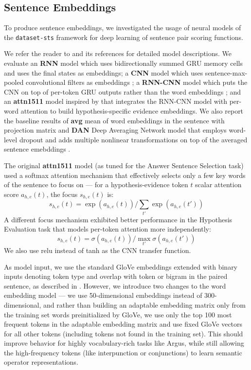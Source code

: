\documentclass[11pt]{article}
\begin{document}
\subsection{Sentence Embeddings}

To produce sentence embeddings, we investigated the usage
of neural models of the \texttt{dataset-sts} framework
for deep learning of sentence pair scoring functions. \cite{sps}

We refer the reader to \cite{sps} and its references for detailed
model descriptions.  We evaluate an \textbf{RNN} model which uses bidirectionally
summed GRU memory cells \cite{GRU} and uses the final states as embeddings;
a \textbf{CNN} model which uses sentence-max-pooled convolutional filters as embeddings \cite{KimMultichannelCNN};
a \textbf{RNN-CNN} model which puts the CNN on top of per-token GRU outputs
rather than the word embeddings \cite{attn1511}; and an \textbf{attn1511} model
inspired by \cite{attn1511} that integrates the RNN-CNN model
with per-word attention to build hypothesis-specific evidence embeddings.
We also report the baseline results of
\textbf{avg} mean of word embeddings in the sentence with projection matrix
and \textbf{DAN} Deep Averaging Network model that employs word-level dropout
and adds multiple nonlinear transformations on top of the averaged sentence
emebddings \cite{DAN}.

The original \textbf{attn1511} model \cite{sps} (as tuned for the Answer Sentence Selection task)
used a softmax attention mechanism that effectively selects only a few key words
of the sentence to focus on --- for a hypothesis-evidence token $t$ scalar attention score $a_{h,e}(t)$,
the focus $s_{h,e}(t)$ is:
$$ s_{h,e}(t) = \exp(a_{h,e}(t)) / \sum_{t'} \exp(a_{h,e}(t')) $$
A different focus mechanism exhibited better performance in the Hypothesis Evaluation task
that models per-token attention more independently:
$$ s_{h,e}(t) = \sigma(a_{h,e}(t)) / \max_{t'} \sigma(a_{h,e}(t')) $$
We also use relu instead of tanh as the CNN transfer function.

As model input, we use the standard GloVe embeddings \cite{GloVe}
extended with binary inputs denoting token type and overlap with token or bigram in the paired sentence,
as described in \cite{sps}.
However, we introduce two changes to the word
embedding model --- we use 50-dimensional embeddings instead of 300-dimensional,
and rather than building an adaptable embedding matrix only from the
training set words preinitialized by GloVe, we use only the top 100
most frequent tokens in the adaptable embedding matrix and use
fixed GloVe vectors for all other tokens (including tokens not
found in the training set).  This should improve behavior for highly
vocabulary-rich tasks like Argus, while still allowing the high-frequency
tokens (like interpunction or conjunctions) to learn semantic operator representations.
\end{document}
